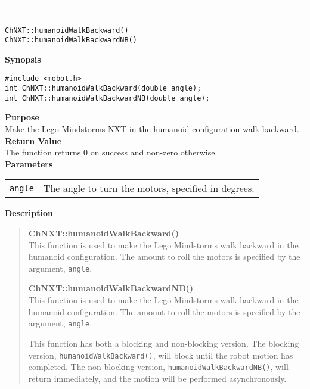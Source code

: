\noindent
\vspace{5pt}
\rule{4.5in}{0.015in}\\
\noindent
{\LARGE \texttt{ChNXT::humanoidWalkBackward()}}\\
{\LARGE \texttt{ChNXT::humanoidWalkBackwardNB()}}\\
{}

\noindent
{\bf Synopsis}
\begin{lstlisting}
#include <mobot.h>
int ChNXT::humanoidWalkBackward(double angle);
int ChNXT::humanoidWalkBackwardNB(double angle);
\end{lstlisting}

\noindent
{\bf Purpose}\\
Make the Lego Mindstorms NXT in the humanoid configuration walk backward.\\

\noindent
{\bf Return Value}\\
The function returns 0 on success and non-zero otherwise.\\

\noindent
{\bf Parameters}\\
\vspace{-0.1in}
\begin{description}
\item               
\begin{tabular}{p{15 mm}p{145 mm}}
\texttt{angle} & The angle to turn the motors, specified in degrees.\\
\end{tabular}
\end{description}

\noindent
{\bf Description}\\
\vspace{-12pt}
\begin{quote}
{\bf ChNXT::humanoidWalkBackward()}\\
This function is used to make the Lego Mindstorms walk backward in the humanoid
configuration. The amount to roll the motors is specified by the argument,
\texttt{angle}.

{\bf ChNXT::humanoidWalkBackwardNB()}\\
This function is used to make the Lego Mindstorms walk backward in the humanoid
configuration. The amount to roll the motors is specified by the argument,
\texttt{angle}.

This function has both a blocking and non-blocking version.
The blocking version, \texttt{humanoidWalkBackward()}, will block until the
robot motion has completed. The non-blocking version, \texttt{humanoidWalkBackwardNB()},
will return immediately, and the motion will be performed asynchronously.\\
\end{quote}

